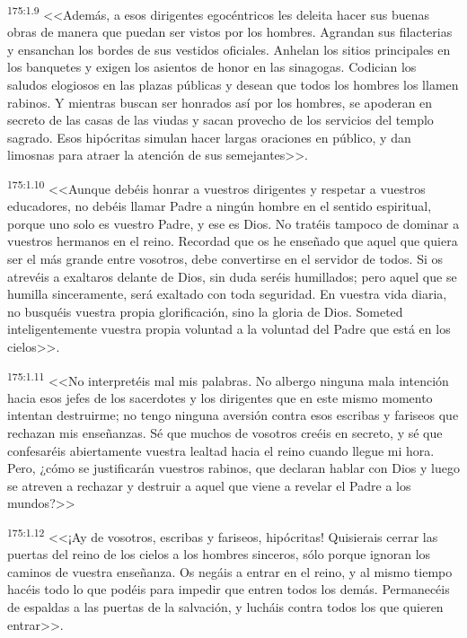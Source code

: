 \par 
\textsuperscript{175:1.9} <<Además, a esos dirigentes egocéntricos les deleita hacer sus buenas obras de manera que puedan ser vistos por los hombres. Agrandan sus filacterias y ensanchan los bordes de sus vestidos oficiales. Anhelan los sitios principales en los banquetes y exigen los asientos de honor en las sinagogas. Codician los saludos elogiosos en las plazas públicas y desean que todos los hombres los llamen rabinos. Y mientras buscan ser honrados así por los hombres, se apoderan en secreto de las casas de las viudas y sacan provecho de los servicios del templo sagrado. Esos hipócritas simulan hacer largas oraciones en público, y dan limosnas para atraer la atención de sus semejantes>>.

\par 
\textsuperscript{175:1.10} <<Aunque debéis honrar a vuestros dirigentes y respetar a vuestros educadores, no debéis llamar Padre a ningún hombre en el sentido espiritual, porque uno solo es vuestro Padre, y ese es Dios. No tratéis tampoco de dominar a vuestros hermanos en el reino. Recordad que os he enseñado que aquel que quiera ser el más grande entre vosotros, debe convertirse en el servidor de todos. Si os atrevéis a exaltaros delante de Dios, sin duda seréis humillados; pero aquel que se humilla sinceramente, será exaltado con toda seguridad. En vuestra vida diaria, no busquéis vuestra propia glorificación, sino la gloria de Dios. Someted inteligentemente vuestra propia voluntad a la voluntad del Padre que está en los cielos>>.

\par 
\textsuperscript{175:1.11} <<No interpretéis mal mis palabras. No albergo ninguna mala intención hacia esos jefes de los sacerdotes y los dirigentes que en este mismo momento intentan destruirme; no tengo ninguna aversión contra esos escribas y fariseos que rechazan mis enseñanzas. Sé que muchos de vosotros creéis en secreto, y sé que confesaréis abiertamente vuestra lealtad hacia el reino cuando llegue mi hora. Pero, ¿cómo se justificarán vuestros rabinos, que declaran hablar con Dios y luego se atreven a rechazar y destruir a aquel que viene a revelar el Padre a los mundos?>>

\par 
\textsuperscript{175:1.12} <<¡Ay de vosotros, escribas y fariseos, hipócritas! Quisierais cerrar las puertas del reino de los cielos a los hombres sinceros, sólo porque ignoran los caminos de vuestra enseñanza. Os negáis a entrar en el reino, y al mismo tiempo hacéis todo lo que podéis para impedir que entren todos los demás. Permanecéis de espaldas a las puertas de la salvación, y lucháis contra todos los que quieren entrar>>.

